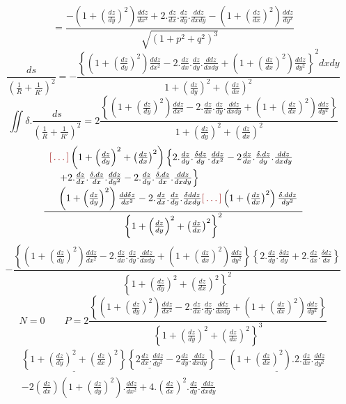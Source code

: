 \documentclass[11pt,a4paper]{article}
\begin{document}
\struck{\ill{}}
\[ = \frac{-\left(1+\left(\frac{dz}{dy}\right)^{2}\right)\frac{ddz}{dx^{2}} + 2.\frac{dz}{dx}.\frac{dz}{dy}.\frac{ddz}{dxdy} - \left(1+\left(\frac{dz}{dx}\right)^{2}\right)\frac{ddz}{dy^{2}}}{\sqrt{(1+p^{2}+q^{2})^{3}}} \]
\[ \frac{ds}{\left(\frac{1}{R}+\frac{1}{R'}\right)^{2}} = -\frac{\left\{\left(1+\left(\frac{dz}{dy}\right)^{2}\right)\frac{ddz}{dx^{2}} - 2.\frac{dz}{dx}.\frac{dz}{dy}.\frac{ddz}{dxdy} + \left(1+\left(\frac{dz}{dx}\right)^{2}\right)\frac{ddz}{dy^{2}}\right\}^{2}dxdy}{1+\left(\frac{dz}{dy}\right)^{2}+\left(\frac{dz}{dx}\right)^{2}} \]
\[ \iint\delta.\frac{ds}{\left(\frac{1}{R}+\frac{1}{R'}\right)^{2}} = 2\frac{\left\{\left(1+\left(\frac{dz}{dy}\right)^{2}\right)\frac{ddz}{dx^{2}} - 2.\frac{dz}{dx}.\frac{dz}{dy}.\frac{ddz}{dxdy} + \left(1+\left(\frac{dz}{dx}\right)^{2}\right)\frac{ddz}{dy^{2}}\right\}}{1+\left(\frac{dz}{dy}\right)^{2}+\left(\frac{dz}{dx}\right)^{2}} \]
\[ \frac{\begin{array}{l} \ill{}\left(1+\left(\frac{dz}{dy}\right)^{2}+\left(\frac{dz}{dx}\right)^{2}\right)\left\{2.\frac{dz}{dy}.\frac{\delta dz}{dy}.\frac{ddz}{dx^{2}} - 2\frac{dz}{dx}.\frac{\delta.dz}{dy}.\frac{ddz}{dxdy}\right. \\ \quad \left. + 2.\frac{dz}{dx}.\frac{\delta.dz}{dx}.\frac{ddz}{dy^{2}} - 2.\frac{dz}{dy}.\frac{\delta.dz}{dx}.\frac{ddz}{dxdy}\right\} \\ \quad \left(1+\left(\frac{dz}{dy}\right)^{2}\right)\frac{dd\delta z}{dx^{2}} - 2.\frac{dz}{dx}.\frac{dz}{dy}.\frac{\delta ddz}{dxdy} \ill{} \left(1+\left(\frac{dz}{dx}\right)^{2}\right)\frac{\delta.ddz}{dy^{2}} \end{array}}{\left\{1+\left(\frac{dz}{dy}\right)^{2}+\left(\frac{dz}{dx}\right)^{2}\right\}^{2}} \]
\[ -\frac{\left\{\left(1+\left(\frac{dz}{dy}\right)^{2}\right)\frac{ddz}{dx^{2}} - 2.\frac{dz}{dx}.\frac{dz}{dy}.\frac{ddz}{dxdy} + \left(1+\left(\frac{dz}{dx}\right)^{2}\right)\frac{ddz}{dy^{2}}\right\}\left\{2.\frac{dz}{dy}.\frac{\delta dz}{dy} + 2.\frac{dz}{dx}.\frac{\delta dz}{dx}\right\}}{\left\{1+\left(\frac{dz}{dy}\right)^{2}+\left(\frac{dz}{dx}\right)^{2}\right\}^{2}} \]
\[ N = 0 \qquad P = 2\frac{\left\{\left(1+\left(\frac{dz}{dy}\right)^{2}\right)\frac{ddz}{dx^{2}} - 2.\frac{dz}{dx}.\frac{dz}{dy}.\frac{ddz}{dxdy} + \left(1+\left(\frac{dz}{dx}\right)^{2}\right)\frac{ddz}{dy^{2}}\right\}}{\left\{1+\left(\frac{dz}{dy}\right)^{2}+\left(\frac{dz}{dx}\right)^{2}\right\}^{3}} \]
\[ \begin{array}{l} \underline{\left\{1+\left(\frac{dz}{dy}\right)^{2}+\left(\frac{dz}{dx}\right)^{2}\right\}}\left\{\underline{2\frac{dz}{dx}.\frac{ddz}{dy^{2}}} - 2\frac{dz}{dy}.\frac{ddz}{dxdy}\right\} - \underline{\left(1+\left(\frac{dz}{dx}\right)^{2}\right).2.\frac{dz}{dx}.\frac{ddz}{dy^{2}}} \\ - 2\left(\frac{dz}{dx}\right)\left(1+\left(\frac{dz}{dy}\right)^{2}\right).\frac{ddz}{dx^{2}} + 4.\left(\frac{dz}{dx}\right)^{2}.\frac{dz}{dy}.\frac{ddz}{dxdy} \end{array} \]
\end{document}
